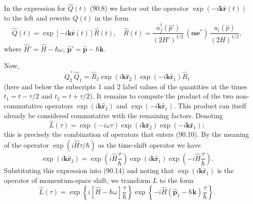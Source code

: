 
In the expression for $\hat{Q}(t)$ (90.8) we factor out the operator $\exp(-i\mathbf{k}\hat{\mathbf{r}}(t))$ to the left and rewrite $\hat{Q}(t)$ in the form
\begin{equation}
\hat{Q}(t) = \exp\!\left[-i\mathbf{k}\hat{\mathbf{r}}(t)\right]\hat{R}(t), \quad \hat{R}(t) = \frac{u_f^\dagger(\hat{p}')}{(2H')^{1/2}}\,(\boldsymbol{\alpha}\mathbf{e}^*)\,\frac{u_i(\hat{p})}{(2H)^{1/2}},
\label{eq:90.12}
\end{equation}
where $\hat{H}' = \hat{H} - \hbar\omega$, $\hat{\mathbf{p}}' = \hat{\mathbf{p}} - \hbar\mathbf{k}$.

Now,
\begin{equation}
\hat{Q}_2^+\hat{Q}_1 = \hat{R}_2\exp(i\mathbf{k}\hat{\mathbf{r}}_2)\exp(-i\mathbf{k}\hat{\mathbf{r}}_1)\hat{R}_1
\label{eq:90.13}
\end{equation}
(here and below the subscripts 1 and 2 label values of the quantities at the times $t_1 = t - \tau/2$ and $t_2 = t + \tau/2$). It remains to compute the product of the two non-commutative operators $\exp(i\mathbf{k}\hat{\mathbf{r}}_2)$ and $\exp(-i\mathbf{k}\hat{\mathbf{r}}_1)$. This product can itself already be considered commutative with the remaining factors. Denoting
\begin{equation}
\hat{L}(\tau) = \exp(-i\omega\tau)\exp(i\mathbf{k}\hat{\mathbf{r}}_2)\exp(-i\mathbf{k}\hat{\mathbf{r}}_1);
\label{eq:90.14}
\end{equation}
this is precisely the combination of operators that enters (90.10). By the meaning of the operator $\exp\!\left(i\hat{H}\tau/\hbar\right)$ as the time-shift operator we have
\[
\exp(i\mathbf{k}\hat{\mathbf{r}}_2) = \exp\!\left(i\hat{H}\frac{\tau}{\hbar}\right)\exp(i\mathbf{k}\hat{\mathbf{r}}_1)\exp\!\left(-i\hat{H}\frac{\tau}{\hbar}\right).
\]
Substituting this expression into (90.14) and noting that $\exp(i\mathbf{k}\hat{\mathbf{r}}_1)$ is the operator of momentum-space shift, we transform $L$ to the form
\begin{equation}
\hat{L}(\tau) = \exp\!\left\{i[\hat{H} - \hbar\omega]\frac{\tau}{\hbar}\right\}\exp\!\left\{-i\hat{H}(\hat{\mathbf{p}}_1 - \hbar\mathbf{k})\frac{\tau}{\hbar}\right\}.
\label{eq:90.15}
\end{equation}

